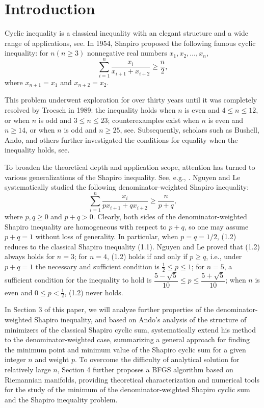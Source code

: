 \documentclass[a4paper,fleqn,numbers]{cas-sc}
\begin{document}
	\maketitle
	
	\section{Introduction}\label{}
	
	Cyclic inequality is a classical inequality with an elegant structure and a wide range of applications, see\cite{steele2004}. In 1954, Shapiro proposed the following famous cyclic inequality: for $n(n\geq 3)$ nonnegative real numbers $x_1, x_2, \ldots, x_n$,
	\[
	\sum_{i=1}^{n} \frac{x_i}{x_{i+1}+x_{i+2}} \geq \frac{n}{2},
	\tag{1.1}
	\]
	where $x_{n+1}=x_1$ and $x_{n+2}=x_2$.
	
	This problem underwent exploration for over thirty years until it was completely resolved by Troesch in 1989: the inequality holds when $n$ is even and $4 \leq n \leq 12$, or when $n$ is odd and $3 \leq n \leq 23$; counterexamples exist when $n$ is even and $n \geq 14$, or when $n$ is odd and $n \geq 25$, see\cite{troesch1985}\cite{troesch1989}. Subsequently, scholars such as Bushell, Ando, and others further investigated the conditions for equality when the inequality holds, see\cite{bushell1994}\cite{bushell2002}\cite{ando2013}.
	
	To broaden the theoretical depth and application scope, attention has turned to various generalizations of the Shapiro inequality. See, e.g.,  \cite{choudhury2022}\cite{radulescu2012}\cite{tanriverdi2012}. Nguyen and Le \cite{nguyen2009} systematically studied the following denominator-weighted Shapiro inequality:
	\[
	\sum_{i=1}^{n} \frac{x_i}{p x_{i+1} + q x_{i+2}} \geq \frac{n}{p+q},
	\tag{1.2}
	\]
	where $p,q \geq 0$ and $p+q>0$. Clearly, both sides of the denominator-weighted Shapiro inequality are homogeneous with respect to $p+q$, so one may assume $p+q=1$ without loss of generality. In particular, when $p=q=1/2$, (1.2) reduces to the classical Shapiro inequality (1.1). Nguyen and Le proved that (1.2) always holds for $n=3$; for $n=4$, (1.2) holds if and only if $p \geq q$, i.e., under $p+q=1$ the necessary and sufficient condition is $\frac{1}{2}\leq p \leq 1$; for $n=5$, a sufficient condition for the inequality to hold is $\dfrac{5-\sqrt{5}}{10} \leq p \leq \dfrac{5+\sqrt{5}}{10}$; when $n$ is even and $0\leq p<\frac{1}{2}$, (1.2) never holds. 
	
	In Section 3 of this paper, we will analyze further properties of the denominator-weighted Shapiro inequality, and based on Ando's analysis of the structure of minimizers of the classical Shapiro cyclic sum, systematically extend his method to the denominator-weighted case, summarizing a general approach for finding the minimum point and minimum value of the Shapiro cyclic sum for a given integer $n$ and weight $p$. To overcome the difficulty of analytical solution for relatively large $n$, Section 4 further proposes a BFGS algorithm based on Riemannian manifolds, providing theoretical characterization and numerical tools for the study of the minimum of the denominator-weighted Shapiro cyclic sum and the Shapiro inequality problem.
	
\end{document}
